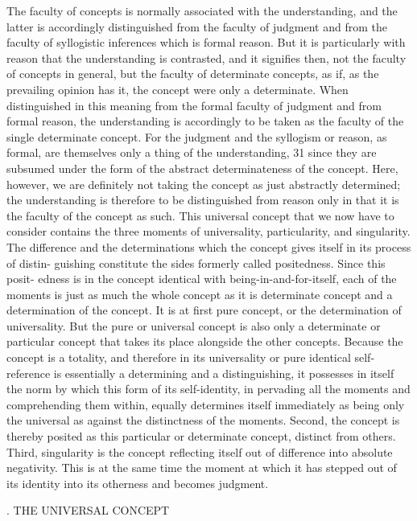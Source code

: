 The faculty of concepts is normally associated with the understanding, and
the latter is accordingly distinguished from the faculty of judgment and
from the faculty of syllogistic inferences which is formal reason. But it is
particularly with reason that the understanding is contrasted, and it signifies
then, not the faculty of concepts in general, but the faculty of determinate
concepts, as if, as the prevailing opinion has it, the concept were only a
determinate. When distinguished in this meaning from the formal faculty
of judgment and from formal reason, the understanding is accordingly to
be taken as the faculty of the single determinate concept. For the judgment
and the syllogism or reason, as formal, are themselves only a thing of the
understanding, 31 since they are subsumed under the form of the abstract
determinateness of the concept. Here, however, we are definitely not taking
the concept as just abstractly determined; the understanding is therefore
to be distinguished from reason only in that it is the faculty of the concept
as such.
This universal concept that we now have to consider contains the three
moments of universality, particularity, and singularity. The difference and
the determinations which the concept gives itself in its process of distin-
guishing constitute the sides formerly called positedness. Since this posit-
edness is in the concept identical with being-in-and-for-itself, each of the
moments is just as much the whole concept as it is determinate concept and
a determination of the concept.
It is at first pure concept, or the determination of universality. But the
pure or universal concept is also only a determinate or particular concept
that takes its place alongside the other concepts. Because the concept is
a totality, and therefore in its universality or pure identical self-reference
is essentially a determining and a distinguishing, it possesses in itself the
norm by which this form of its self-identity, in pervading all the moments
and comprehending them within, equally determines itself immediately as
being only the universal as against the distinctness of the moments.
Second, the concept is thereby posited as this particular or determinate
concept, distinct from others.
Third, singularity is the concept reflecting itself out of difference into
absolute negativity. This is at the same time the moment at which it has
stepped out of its identity into its otherness and becomes judgment.

. THE UNIVERSAL CONCEPT

